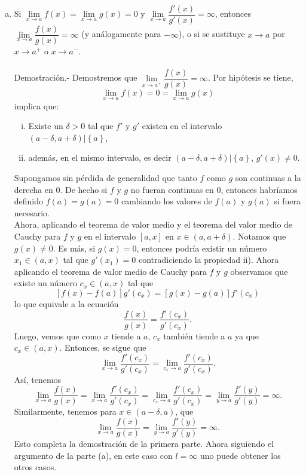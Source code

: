 \begin{enumerate}[\bfseries 1.]
\begin{enumerate}[(a)]
	    \item Si $\lim\limits_{x\to a}f(x)=\lim\limits_{x\to a}g(x)=0$ y $\lim\limits_{x\to a}\dfrac{f'(x)}{g'(x)}=\infty$, entonces $\lim\limits_{x\to a}\dfrac{f(x)}{g(x)}=\infty$ (y análogamente para $-\infty$), o si se sustituye $x\to a$ por $x\to a^+$ o $x\to a^-$.\\\\
		Demostración.-\; Demostremos que $\lim\limits_{x\to a^+}\dfrac{f(x)}{g(x)}=\infty$. Por hipótesis se tiene,
		$$\lim_{x\to a}f(x)=0=\lim_{x\to a}g(x)$$
		implica que:
		\begin{enumerate}[i.]
		    \item Existe un $\delta>0$ tal que $f'$ y $g'$ existen en el intervalo $(a-\delta,a+\delta) | \left\{a\right\}$,
		    \item además, en el mismo intervalo, es decir $(a-\delta,a+\delta)|\left\{a\right\}$, $g'(x)\neq 0$.
		\end{enumerate}
		Supongamos sin pérdida de generalidad que tanto $f$ como $g$ son continuas a la derecha en $0$. De hecho si $f$ y $g$ no fueran continuas en $0$, entonces habríamos definido $f(a)=g(a)=0$ cambiando los valores de $f(a)$ y $g(a)$ si fuera necesario.\\
		Ahora, aplicando el teorema de valor medio y el teorema del valor medio de Cauchy para $f$ y $g$ en el intervalo $[a,x]$ en $x\in (a,a+\delta)$. Notamos que $g(x)\neq 0$. Es más, si $g(x)=0$, entonces podría existir un número $x_1\in(a,x)$ tal que $g'(x_1)=0$ contradiciendo la propiedad ii). Ahora aplicando el teorema de valor medio de Cauchy para $f$ y $g$ observamos que existe un número $c_x\in(a,x)$ tal que
		$$\left[f(x)-f(a)\right]g'(c_x)=\left[g(x)-g(a)\right]f'(c_x)$$
		lo que equivale a la ecuación
		$$\dfrac{f(x)}{g(x)}=\dfrac{f'(c_x)}{g'(c_x)}.$$
		Luego, vemos que como $x$ tiende a $a$, $c_x$ también tiende a $a$ ya que $c_x\in(a,x)$. Entonces, se sigue que
		$$\lim_{x\to a}\dfrac{f'(c_x)}{g'(c_x)}=\lim_{c_x\to a}\dfrac{f'(c_x)}{g'(c_x)}.$$
		Así, tenemos
		$$\lim_{x\to a}\dfrac{f(x)}{g(x)}=\lim_{x\to a}\dfrac{f'(c_x)}{g'(c_x)}=\lim_{c_x\to a}\dfrac{f'(c_x)}{g'(c_x)}=\lim_{y\to a}\dfrac{f'(y)}{g'(y)}=\infty.$$
		Similarmente, tenemos para $x\in (a-\delta,a)$, que
		$$\lim_{x\to a}\dfrac{f(x)}{g(x)}=\lim_{y\to a}\dfrac{f'(y)}{g'(y)}=\infty.$$
		Esto completa la demostración de la primera parte. Ahora siguiendo el argumento de la parte (a), en este caso con $l=\infty$  uno puede obtener los otros casos.\\\\


\end{enumerate}
\end{enumerate}
